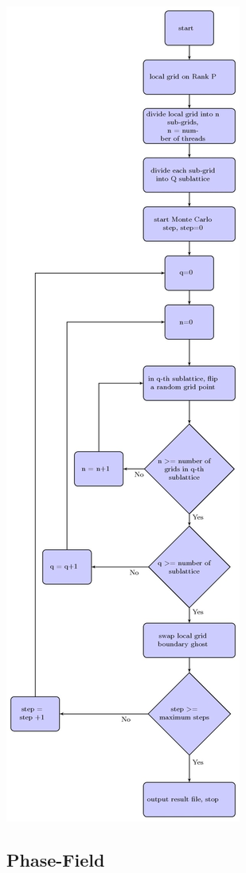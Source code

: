 \documentclass[11pt]{article}
\begin{document}
\begin{multicols}{2}
\begin{minipage}{0.45\textwidth}\centering
  \includegraphics[height=0.95\textheight]{mc-fig-02}
\end{minipage}

\subsection*{Phase-Field}

\label{LastPage}
\end{multicols}
\end{document}
